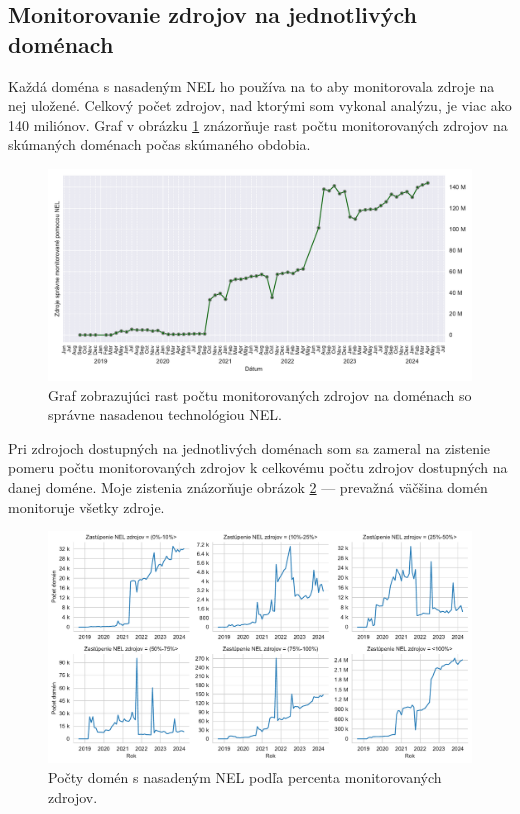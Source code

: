 \subsection{Monitorovanie zdrojov na jednotlivých doménach}

Každá doména s nasadeným NEL ho používa na to aby monitorovala zdroje na nej uložené.
Celkový počet zdrojov, nad ktorými som vykonal analýzu, je viac ako 140 miliónov.
Graf v obrázku \ref{fig:httparchive-nel-deployment-resources} znázorňuje rast počtu monitorovaných zdrojov na skúmaných doménach počas skúmaného obdobia.

\begin{figure}[!htb]
\begin{center}
 \includegraphics[scale=0.59]{obrazky-figures/httparchive_nel_deployment_resources.pdf}
 \caption{Graf zobrazujúci rast počtu monitorovaných zdrojov na doménach so správne nasadenou technológiou NEL.}
 \label{fig:httparchive-nel-deployment-resources}
\end{center}
\end{figure}

Pri zdrojoch dostupných na jednotlivých doménach som sa zameral na zistenie pomeru počtu monitorovaných zdrojov k celkovému počtu zdrojov dostupných na danej doméne.
Moje zistenia znázorňuje obrázok \ref{fig:httparchive-nel-monitored-resources-precentage-dist} --- prevažná väčšina domén monitoruje všetky zdroje.

\begin{figure}[!htb]
\begin{center}
 \includegraphics[scale=0.56]{obrazky-figures/httparchive_nel_monitored_resources_percentage_dist.pdf}
 \caption{Počty domén s nasadeným NEL podľa percenta monitorovaných zdrojov.}
 \label{fig:httparchive-nel-monitored-resources-precentage-dist}
\end{center}
\end{figure}

